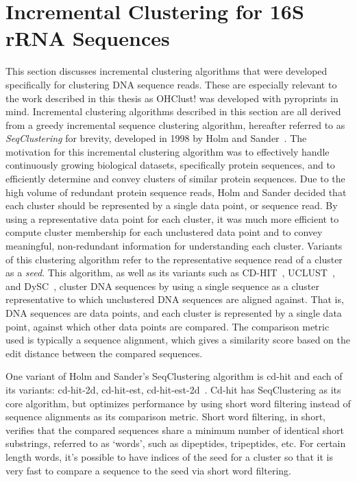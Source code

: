 \documentclass[12pt]{ucthesis}
\begin{document}
   \section{Incremental Clustering for 16S rRNA Sequences}\label{sec:seq_incr_cluster}
   This section discusses incremental clustering algorithms that were
   developed specifically for clustering DNA sequence reads. These are
   especially relevant to the work described in this thesis as \textsf{OHClust!} was
   developed with pyroprints in mind. Incremental clustering algorithms
   described in this section are all derived from a greedy incremental sequence
   clustering algorithm, hereafter referred to as \textit{SeqClustering} for
   brevity, developed in 1998 by Holm and Sander~\cite{Holm:Greedy}. The
   motivation for this incremental clustering algorithm was to effectively
   handle continuously growing biological datasets, specifically protein
   sequences, and to efficiently determine and convey clusters of similar
   protein sequences. Due to the high volume of redundant protein sequence
   reads, Holm and Sander decided that each cluster should be represented by a
   single data point, or sequence read. By using a representative data point
   for each cluster, it was much more efficient to compute cluster membership
   for each unclustered data point and to convey meaningful, non-redundant
   information for understanding each cluster. Variants of this clustering
   algorithm refer to the representative sequence read of a cluster as a
   \textit{seed}. This algorithm, as well as its variants such as
   CD-HIT~\cite{Li:CD_Hit}, UCLUST~\cite{Edgar:UCLUST}, and
   DySC~\cite{Zheng:DySC}, cluster DNA sequences by using a single sequence as
   a cluster representative to which unclustered DNA sequences are aligned
   against. That is, DNA sequences are data points, and each cluster is
   represented by a single data point, against which other data points are
   compared. The comparison metric used is typically a sequence alignment,
   which gives a similarity score based on the edit distance between the
   compared sequences.

   One variant of Holm and Sander's SeqClustering algorithm is cd-hit and each
   of its variants: cd-hit-2d, cd-hit-est, cd-hit-est-2d~\cite{Li:CD_Hit,
   Li:Redundancy}. Cd-hit has SeqClustering as its core algorithm, but
   optimizes performance by using short word filtering instead of sequence
   alignments as its comparison metric. Short word filtering, in short,
   verifies that the compared sequences share a minimum number of identical
   short substrings, referred to as `words', such as dipeptides, tripeptides,
   etc. For certain length words, it's possible to have indices of the seed for
   a cluster so that it is very fast to compare a sequence to the seed via
   short word filtering.
\end{document}
